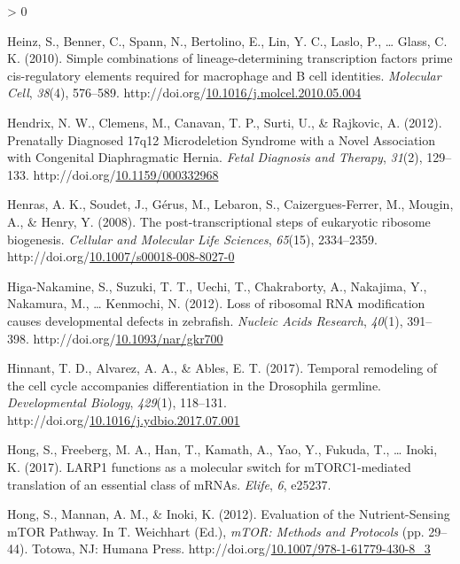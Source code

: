 \documentclass[12pt,oneside]{reedthesis}
\newlength{\cslhangindent}
\newenvironment{CSLReferences}[2] %
 {%
  \setlength{\parindent}{0pt}
  \ifodd #1 \everypar{\setlength{\hangindent}{\cslhangindent}}\ignorespaces\fi
  \ifnum #2 > 0
  \setlength{\parskip}{#2\baselineskip}
  \fi
 }%
 {}
\begin{document}
\begin{CSLReferences}{1}{0}
\leavevmode\hypertarget{ref-heinzSimpleCombinationsLineagedetermining2010}{}%
Heinz, S., Benner, C., Spann, N., Bertolino, E., Lin, Y. C., Laslo, P., \ldots{} Glass, C. K. (2010). Simple combinations of lineage-determining transcription factors prime cis-regulatory elements required for macrophage and {B} cell identities. \emph{Molecular Cell}, \emph{38}(4), 576--589. http://doi.org/\href{https://doi.org/10.1016/j.molcel.2010.05.004}{10.1016/j.molcel.2010.05.004}

\leavevmode\hypertarget{ref-hendrixPrenatallyDiagnosed17q122012}{}%
Hendrix, N. W., Clemens, M., Canavan, T. P., Surti, U., \& Rajkovic, A. (2012). Prenatally {Diagnosed} 17q12 {Microdeletion Syndrome} with a {Novel Association} with {Congenital Diaphragmatic Hernia}. \emph{Fetal Diagnosis and Therapy}, \emph{31}(2), 129--133. http://doi.org/\href{https://doi.org/10.1159/000332968}{10.1159/000332968}

\leavevmode\hypertarget{ref-Henras2008c}{}%
Henras, A. K., Soudet, J., Gérus, M., Lebaron, S., Caizergues-Ferrer, M., Mougin, A., \& Henry, Y. (2008). The post-transcriptional steps of eukaryotic ribosome biogenesis. \emph{Cellular and Molecular Life Sciences}, \emph{65}(15), 2334--2359. http://doi.org/\href{https://doi.org/10.1007/s00018-008-8027-0}{10.1007/s00018-008-8027-0}

\leavevmode\hypertarget{ref-Higa-Nakamine2012o}{}%
Higa-Nakamine, S., Suzuki, T. T., Uechi, T., Chakraborty, A., Nakajima, Y., Nakamura, M., \ldots{} Kenmochi, N. (2012). Loss of ribosomal {RNA} modification causes developmental defects in zebrafish. \emph{Nucleic Acids Research}, \emph{40}(1), 391--398. http://doi.org/\href{https://doi.org/10.1093/nar/gkr700}{10.1093/nar/gkr700}

\leavevmode\hypertarget{ref-hinnantTemporalRemodelingCell2017}{}%
Hinnant, T. D., Alvarez, A. A., \& Ables, E. T. (2017). Temporal remodeling of the cell cycle accompanies differentiation in the {Drosophila} germline. \emph{Developmental Biology}, \emph{429}(1), 118--131. http://doi.org/\href{https://doi.org/10.1016/j.ydbio.2017.07.001}{10.1016/j.ydbio.2017.07.001}

\leavevmode\hypertarget{ref-Hong2017a}{}%
Hong, S., Freeberg, M. A., Han, T., Kamath, A., Yao, Y., Fukuda, T., \ldots{} Inoki, K. (2017). {LARP1} functions as a molecular switch for {mTORC1}-mediated translation of an essential class of {mRNAs}. \emph{Elife}, \emph{6}, e25237.

\leavevmode\hypertarget{ref-hongEvaluationNutrientSensingMTOR2012}{}%
Hong, S., Mannan, A. M., \& Inoki, K. (2012). Evaluation of the {Nutrient}-{Sensing mTOR Pathway}. In T. Weichhart (Ed.), \emph{{mTOR}: {Methods} and {Protocols}} (pp. 29--44). {Totowa, NJ}: {Humana Press}. http://doi.org/\href{https://doi.org/10.1007/978-1-61779-430-8_3}{10.1007/978-1-61779-430-8\_3}


\end{CSLReferences}
\end{document}
